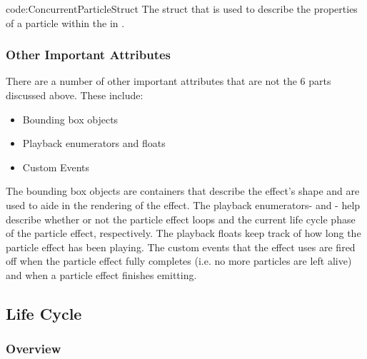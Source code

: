 {code:ConcurrentParticleStruct}
{The struct that is used to describe the properties of a particle within the  in .}

\subsubsection{Other Important Attributes}

There are a number of other important attributes that are not the 6 parts discussed above. These include:

\begin{itemize}[nolistsep,topsep=10pt]

	\item Bounding box objects
	\item Playback enumerators and floats
	\item Custom Events

\end{itemize}

The bounding box objects are containers that describe the effect's shape and are used to aide in the rendering of the effect. The playback enumerators-  and - help describe whether or not the particle effect loops and the current life cycle phase of the particle effect, respectively. The playback floats keep track of how long the particle effect has been playing. The custom events that the effect uses are fired off when the particle effect fully completes (i.e. no more particles are left alive) and when a particle effect finishes emitting.

\subsection{Life Cycle}\label{ssec:cs_pec_lifecycle}

\subsubsection{Overview}

